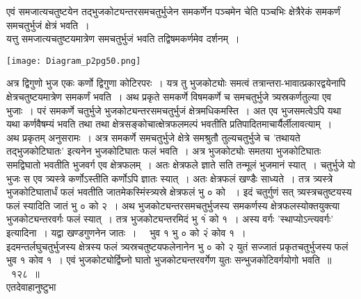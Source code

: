 \documentclass[11pt, openany]{book}
\begin{document}
\begin{sloppypar}
एवं समजात्यचतुष्टयेन तद्भुजकोट्यन्तरसमचतुर्भुजेन समकर्णेन पञ्चमेन चेति पञ्चभिः क्षेत्रैरेकं समकर्णं समचतुर्भुजं क्षेत्रं भवति~।\\

यत्तु समजात्यचतुष्टयमात्रेण समचतुर्भुजं भवति तद्विषमकर्णमेव दर्शनम्~।

\begin{center}
    \texttt{[image: Diagram\_p2pg50.png]}
\end{center}

अत्र द्विगुणो भुज एकः कर्णो द्विगुणा कोटिरपरः~। यत्र तु भुजकोट्योः समत्वं तत्रान्तरा-भावात्प्रकारद्वयेनापि क्षेत्रचतुष्टयमात्रेण समकर्णं भवति~। अथ प्रकृते समकर्णे विषमकर्णे च समचतुर्भुजे त्र्यस्रकर्णतुल्या एव भुजाः~। परं समकर्णे चतुर्भुजे भुजकोट्यन्तरसमचतुर्भुजं क्षेत्रमधिकमस्ति~। अत एव भुजसमत्वेऽपि यथा यथा कर्णवैषम्यं भवति तथा तथा क्षेत्रसङ्कोचात्क्षेत्रफलमल्पं भवतीति प्रतिपादितमाचार्यैर्लीलावत्याम्~।\\

अथ प्रकृतम् अनुसरामः~। अत्र समकर्णे समचतुर्भुजे क्षेत्रे समश्रुतौ तुल्यचतुर्भुजे च {\color{violet}'तथायते तद्भुजकोटिघातः'} इत्यनेन भुजकोटिघातः फलं भवति~। अत्र भुजकोट्योः समतया भुजकोटिघातः समद्विघातो भवतीति भुजवर्ग एव क्षेत्रफलम्~। अतः क्षेत्रफले ज्ञाते सति तन्मूलं भुजमानं स्यात्~। चतुर्भुजे यो भुजः स एव त्र्यस्त्रे कर्णोऽस्तीति कर्णोऽपि ज्ञातः स्यात्~। अतः क्षेत्रफलं खण्डैः साध्यते~। तत्र त्र्यस्त्रे भुजकोटिघातार्धं फलं भवतीति जातमेकस्मिंस्त्र्यस्रे क्षेत्रफलं भु ० को ~। इदं चतुर्गुणं सत् त्र्यस्त्रचतुष्टयस्य फलं स्यादिति जातं भु ० को २~। अथ भुजकोट्यन्तरसमचतुर्भुजस्य समकर्णस्य क्षेत्रफलस्योक्तयुक्त्या भुजकोट्यन्तरवर्गः फलं स्यात्~। तत्र भुजकोट्यन्तरमिदं भु १ं को १~। अस्य वर्गः {\color{violet}'स्थाप्योऽन्त्यवर्गः'} इत्यादिना~। यद्वा खण्डगुणनेन जातः~। ~~भुव १ भु ० को २ं कोव १~।\\

इदमन्तर्लघुचतुर्भुजस्य क्षेत्रस्य फलं त्र्यस्रचतुष्टयफलेनानेन भु ० को २ युतं सज्जातं प्रकृतचतुर्भुजस्य फलं भुव १ कोव १~। एवं भुजकोट्योर्द्विघ्नो घातो भुजकोट्यन्तरवर्गेण युतः सन्भुजकोटिवर्गयोगो भवति~॥~१२८~॥\\

{\small एतदेवाहानुष्टुभा\textendash }
\end{sloppypar}
\end{document}

